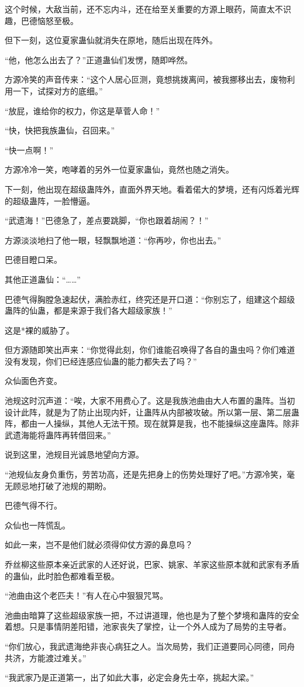 \begin{this_body}
这个时候，大敌当前，还不忘内斗，还在给至关重要的方源上眼药，简直太不识趣，巴德恼怒至极。

但下一刻，这位夏家蛊仙就消失在原地，随后出现在阵外。

“他，他怎么出去了？”正道蛊仙们发愣，随即哗然。

方源冷笑的声音传来：“这个人居心叵测，竟想挑拨离间，被我挪移出去，废物利用一下，试探对方的底细。”

“放屁，谁给你的权力，你这是草菅人命！”

“快，快把我族蛊仙，召回来。”

“快一点啊！”

方源冷冷一笑，咆哮着的另外一位夏家蛊仙，竟然也随之消失。

下一刻，他出现在超级蛊阵外，直面外界天地。看着偌大的梦境，还有闪烁着光辉的超级蛊阵，一脸懵逼。

“武遗海！”巴德急了，差点要跳脚，“你也跟着胡闹？！”

方源淡淡地扫了他一眼，轻飘飘地道：“你再吵，你也出去。”

巴德目瞪口呆。

其他正道蛊仙：“……”

巴德气得胸膛急速起伏，满脸赤红，终究还是开口道：“你别忘了，组建这个超级蛊阵的仙蛊，都是来源于我们各大超级家族！”

这是*裸的威胁了。

但方源随即笑出声来：“你觉得此刻，你们谁能召唤得了各自的蛊虫吗？你们难道没有发现，你们已经连感应仙蛊的能力都失去了吗？”

众仙面色齐变。

池规这时沉声道：“唉，大家不用费心了。这是我族池曲由大人布置的蛊阵。当初设计此阵，就是为了防止出现内奸，让蛊阵从内部被攻破。所以第一层、第二层蛊阵，都由一人操纵，其他人无法干预。现在就算是我，也不能操纵这座蛊阵。除非武遗海能将蛊阵再转借回来。”

说到这里，池规目光诚恳地望向方源。

“池规仙友身负重伤，劳苦功高，还是先把身上的伤势处理好了吧。”方源冷笑，毫无顾忌地打破了池规的期盼。

巴德气得不行。

众仙也一阵慌乱。

如此一来，岂不是他们就必须得仰仗方源的鼻息吗？

乔丝柳这些原本亲近武家的人还好说，巴家、姚家、羊家这些原本就和武家有矛盾的蛊仙，此时脸色都难看至极。

“池曲由这个老匹夫！”有人在心中狠狠咒骂。

池曲由暗算了这些超级家族一把，不过讲道理，他也是为了整个梦境和蛊阵的安全着想。只是事情阴差阳错，池家丧失了掌控，让一个外人成为了局势的主导者。

“你们放心，我武遗海绝非丧心病狂之人。当次局势，我们正道要同心同德，同舟共济，方能渡过难关。”

“我武家乃是正道第一，出了如此大事，必定会身先士卒，挑起大梁。”

\end{this_body}

